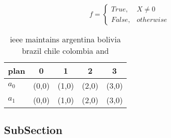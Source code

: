 \documentclass[a4paper]{article}
\begin{document}
\begin{equation}   f =
\begin{cases} True, & X \neq 0\\
False, & otherwise
\end{cases}
\end{equation}

\begin{table}
\begin{adjustbox}{width=0.5\columnwidth}
\begin{tabular}{|l|l|l|l|l|}
\hline
\textbf{plan} & \multicolumn{1}{c|}{\textbf{0}} & \multicolumn{1}{c|}{\textbf{1}} & \multicolumn{1}{c|}{\textbf{2}} & \multicolumn{1}{c|}{\textbf{3}} \\ \hline
\textbf{$a_0$}  & (0,0) & (1,0) & (2,0) & (3,0) \\ \hline
\textbf{$a_1$}  & (0,0) & (1,0) & (2,0) & (3,0) \\ \hline
\end{tabular}
\end{adjustbox}
\caption{ieee maintains argentina bolivia brazil chile colombia and 
}
\end{table}

\subsection{SubSection}
\end{document}
